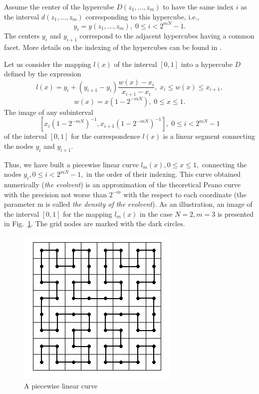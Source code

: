 \begin{enumerate}
Assume the center of the hypercube $D(z_1,...,z_m)$ to have the same index $i$ as the interval $d(z_1,...,z_m)$ corresponding to this hypercube, i.e.,
\[
y_i = y(z_1,...,z_m), \; 0 \leq i < 2^{mN}-1.
\]
The centers $y_i$ and $y_{i+1}$ correspond to the adjacent hypercubes having a common facet. More details on the indexing of the hypercubes can be found in \cite{6_Strongin2013}.
\end{enumerate}

Let us consider the mapping  $l(x)$ of the interval $[0,1]$ into a hypercube $D$ defined by the expression 
\[
l(x)=y_i+(y_{i+1}-y_i)\frac{w(x)-x_i}{x_{i+1}-x_i}, \; x_i \leq w(x) \leq x_{i+1},
\]
\[
w(x)=x(1-2^{-mN}), \; 0 \leq x \leq 1.
\]
The image of any subinterval
\[
\left[x_i(1-2^{-mN})^{-1}, x_{i+1}(1-2^{-mN})^{-1}\right], \; 0 \leq i < 2^{mN}-1
\]
of the interval $[0,1]$ for the correspondence $l(x)$ is a linear segment connecting the nodes $y_i$ and $y_{i+1}$.

Thus, we have built a piecewise linear curve $l_m(x), 0 \leq x \leq 1,$ connecting the nodes $y_i, 0 \leq i< 2^{mN}-1,$ in the order of their indexing. This curve obtained numerically (\textit{the evolvent})  is an approximation of the theoretical Peano curve with the precision not worse than $2^{-m}$ with the respect to each coordinate (the parameter m is called\textit{ the density of the evolvent}). As an illustration, an image of the interval $[0,1]$ for the mapping $l_m(x)$ in the case $N=2, m=3$ is presented in Fig.~\ref{6_fig_4}. The grid nodes are marked with the dark circles. 

\begin{figure}[t]
\includegraphics[width=0.5\linewidth]{figures/6_4.png}
\caption{A piecewise linear curve}
\label{6_fig_4}     
\end{figure}

